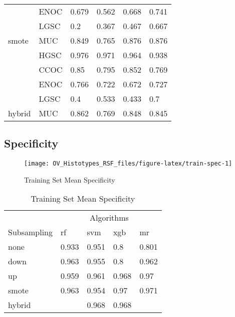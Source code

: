 \documentclass[
]{report}
\begin{document}
\begin{table}
\begin{tabular}[t]{l|l|l|l|l|l}
\cline{2-6}
 & ENOC & 0.679 & 0.562 & 0.668 & 0.741\\
\cline{2-6}
 & LGSC & 0.2 & 0.367 & 0.467 & 0.667\\
\cline{2-6}
\multirow{-5}{*}{\raggedright\arraybackslash smote} & MUC & 0.849 & 0.765 & 0.876 & 0.876\\
\cline{1-6}
 & HGSC & 0.976 & 0.971 & 0.964 & 0.938\\
\cline{2-6}
 & CCOC & 0.85 & 0.795 & 0.852 & 0.769\\
\cline{2-6}
 & ENOC & 0.766 & 0.722 & 0.672 & 0.727\\
\cline{2-6}
 & LGSC & 0.4 & 0.533 & 0.433 & 0.7\\
\cline{2-6}
\multirow{-5}{*}{\raggedright\arraybackslash hybrid} & MUC & 0.862 & 0.769 & 0.848 & 0.845\\
\hline
\end{tabular}
\end{table}

\hypertarget{specificity}{%
\subsection{Specificity}\label{specificity}}

\begin{figure}[H]

{\centering \texttt{[image: OV\_Histotypes\_RSF\_files/figure-latex/train-spec-1]} 

}

\caption{Training Set Mean Specificity}\label{fig:train-spec}
\end{figure}

\begin{table}

\caption{\label{tab:train-spec-table}Training Set Mean Specificity}
\centering
\begin{tabular}[t]{l|l|l|l|l}
\hline
\multicolumn{1}{c|}{ } & \multicolumn{4}{c}{Algorithms} \\
\cline{2-5}
Subsampling & rf & svm & xgb & mr\\
\hline
none & 0.933 & 0.951 & 0.8 & 0.801\\
\hline
down & 0.963 & 0.955 & 0.8 & 0.962\\
\hline
up & 0.959 & 0.961 & 0.968 & 0.97\\
\hline
smote & 0.963 & 0.954 & 0.97 & 0.971\\
\hline
hybrid & \cellcolor[HTML]{90ee90}{0.972} & 0.968 & 0.968 & \cellcolor[HTML]{90ee90}{0.972}\\
\hline
\end{tabular}
\end{table}
\end{document}
